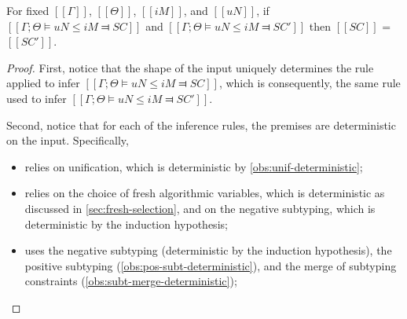 \begin{observation}
    \label{obs:neg-subt-deterministic}
    For fixed $[[Γ]]$, $[[Θ]]$, $[[iM]]$, and $[[uN]]$, 
    if $[[Γ ; Θ ⊨ uN ≤ iM ⫤ SC]]$ 
    and $[[Γ ; Θ ⊨ uN ≤ iM ⫤ SC']]$
    then $[[SC]]$ = $[[SC']]$.
\end{observation}
\begin{proof}
    First, notice that the shape of
    the input uniquely determines the rule applied to infer
    $[[Γ ; Θ ⊨ uN ≤ iM ⫤ SC]]$,
    which is consequently, the same rule used to
    infer $[[Γ ; Θ ⊨ uN ≤ iM ⫤ SC']]$.

    Second, notice that for each of the inference rules, 
    the premises are deterministic on the input.
    Specifically, 
    \begin{itemize}
        \item {} relies on unification,
            which is deterministic by \cref{obs:unif-deterministic};
        \item {} relies on
            the choice of fresh algorithmic variables,
            which is deterministic as discussed in \cref{sec:fresh-selection},
            and on the negative subtyping, which is deterministic by
            the induction hypothesis;
        \item {} uses 
            the negative subtyping 
            (deterministic by the induction hypothesis),
            the positive subtyping 
            (\cref{obs:pos-subt-deterministic}),
            and the merge of subtyping constraints
            (\cref{obs:subt-merge-deterministic});
    \end{itemize}
\end{proof}


